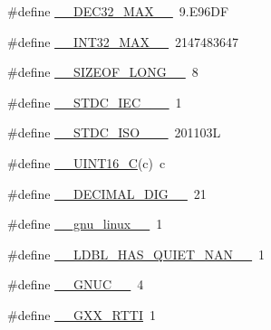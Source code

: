 \begin{DoxyCompactItemize}
\item 
\#define \hyperlink{build-analizer__host-_desktop___qt__5__9__0___g_c_c__64bit-debug_2moc__predefs_8h_ad3165a97a460b88ccdea80967918f250}{\+\_\+\+\_\+\+D\+E\+C32\+\_\+\+M\+A\+X\+\_\+\+\_\+}~9.\+E96\+D\+F
\item 
\#define \hyperlink{build-analizer__host-_desktop___qt__5__9__0___g_c_c__64bit-debug_2moc__predefs_8h_abf681096fa9e21512a3fe83f0dcfdb36}{\+\_\+\+\_\+\+I\+N\+T32\+\_\+\+M\+A\+X\+\_\+\+\_\+}~2147483647
\item 
\#define \hyperlink{build-analizer__host-_desktop___qt__5__9__0___g_c_c__64bit-debug_2moc__predefs_8h_aaa8084a56e3732008acafea8fd15eb2f}{\+\_\+\+\_\+\+S\+I\+Z\+E\+O\+F\+\_\+\+L\+O\+N\+G\+\_\+\+\_\+}~8
\item 
\#define \hyperlink{build-analizer__host-_desktop___qt__5__9__0___g_c_c__64bit-debug_2moc__predefs_8h_ab7d84ba8d87b8bb40aa752334bb51b23}{\+\_\+\+\_\+\+S\+T\+D\+C\+\_\+\+I\+E\+C\+\_\+\_\+\+\_\+}~1
\item 
\#define \hyperlink{build-analizer__host-_desktop___qt__5__9__0___g_c_c__64bit-debug_2moc__predefs_8h_acb6063ed9d8841cf71c93f2bf34832e0}{\+\_\+\+\_\+\+S\+T\+D\+C\+\_\+\+I\+S\+O\+\_\+\_\+\+\_\+}~201103\+L
\item 
\#define \hyperlink{build-analizer__host-_desktop___qt__5__9__0___g_c_c__64bit-debug_2moc__predefs_8h_aa860a111dcff819d3502dda14f8ac778}{\+\_\+\+\_\+\+U\+I\+N\+T16\+\_\+\+C}(c)~c
\item 
\#define \hyperlink{build-analizer__host-_desktop___qt__5__9__0___g_c_c__64bit-debug_2moc__predefs_8h_aeb56455e98000942147dfd63ec1c2fa6}{\+\_\+\+\_\+\+D\+E\+C\+I\+M\+A\+L\+\_\+\+D\+I\+G\+\_\+\+\_\+}~21
\item 
\#define \hyperlink{build-analizer__host-_desktop___qt__5__9__0___g_c_c__64bit-debug_2moc__predefs_8h_a51b087854dc3c2f76946efb432745639}{\+\_\+\+\_\+gnu\+\_\+linux\+\_\+\+\_\+}~1
\item 
\#define \hyperlink{build-analizer__host-_desktop___qt__5__9__0___g_c_c__64bit-debug_2moc__predefs_8h_a10a15ae17c3b791fe9b9721965ebfee4}{\+\_\+\+\_\+\+L\+D\+B\+L\+\_\+\+H\+A\+S\+\_\+\+Q\+U\+I\+E\+T\+\_\+\+N\+A\+N\+\_\+\+\_\+}~1
\item 
\#define \hyperlink{build-analizer__host-_desktop___qt__5__9__0___g_c_c__64bit-debug_2moc__predefs_8h_aa51016843ec55a0a9df7ce9f85767ee7}{\+\_\+\+\_\+\+G\+N\+U\+C\+\_\+\+\_\+}~4
\item 
\#define \hyperlink{build-analizer__host-_desktop___qt__5__9__0___g_c_c__64bit-debug_2moc__predefs_8h_af607715c8c9a98aa72c81c6629554b0d}{\+\_\+\+\_\+\+G\+X\+X\+\_\+\+R\+T\+T\+I}~1

\end{DoxyCompactItemize}
